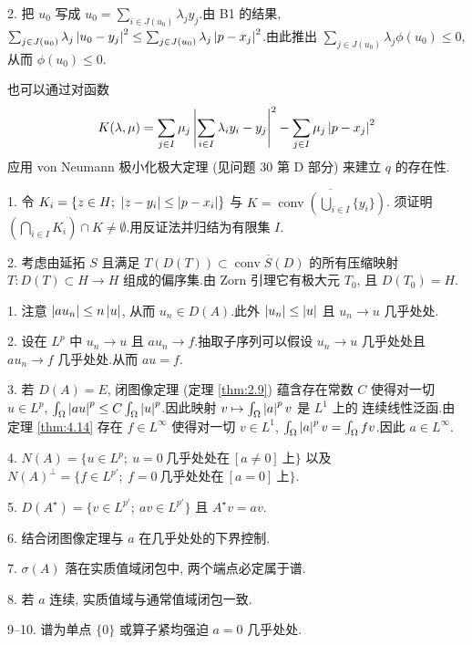 2. 把 $u_0$ 写成 $u_0=\sum_{i\in J(u_0)}\lambda_jy_j$.由 B1 的结果,
$\sum_{j\in J(u_0)}\lambda_j\left|u_0-y_j\right|^2\le\sum_{j\in J(u_0)}\lambda_j\left|p-x_j\right|^2$.由此推出
$\sum_{j\in J(u_0)}\lambda_j\phi(u_0)\le0$, 从而 $\phi(u_0)\le0$.

 也可以通过对函数
\begin{equation*}
K(\lambda,\mu)=\sum_{j\in I}\mu_j\left|\sum_{i\in I}\lambda_iy_i-y_j\right|^2-\sum_{j\in I}\mu_j\left|p-x_j\right|^2
\end{equation*}
应用 von Neumann 极小化极大定理 (见问题 30 第 D 部分) 来建立 $q$ 的存在性.


1. 令 $K_i=\{z\in H;\ \abs{z-y_i}\le\abs{p-x_i}\}$ 与 $K=\overline{\operatorname{conv}\left(\bigcup_{i\in I}\{y_i\}\right)}$.
须证明 $\left(\bigcap_{i\in I}K_i\right)\cap K\ne\emptyset$.用反证法并归结为有限集 $I$.

2. 考虑由延拓 $S$ 且满足 $T(D(T))\subset\overline{\operatorname{conv}S(D)}$ 的所有压缩映射
$T:D(T)\subset H\to H$ 组成的偏序集.由 Zorn 引理它有极大元 $T_0$, 且 $D(T_0)=H$.


1. 注意 $\left|au_n\right|\le n\left|u\right|$, 从而 $u_n\in D(A)$.此外 $\left|u_n\right|\le\left|u\right|$ 且 $u_n\to u$ 几乎处处.

2. 设在 $L^p$ 中 $u_n\to u$ 且 $au_n\to f$.抽取子序列可以假设 $u_n\to u$ 几乎处处且 $au_n\to f$ 几乎处处.从而 $au=f$.

3. 若 $D(A)=E$, 闭图像定理 (定理  \ref{thm:2.9}) 蕴含存在常数 $C$ 使得对一切 $u\in L^p$,
$\int_\Omega\left|au\right|^p\le C\int_\Omega\left|u\right|^p$.因此映射 $v\mapsto\int_\Omega\left|a\right|^pv$ 是 $L^1$ 上的
连续线性泛函.由定理  \ref{thm:4.14} 存在 $f\in L^\infty$ 使得对一切 $v\in L^1$,
$\int_\Omega\left|a\right|^pv=\int_\Omega fv$.因此 $a\in L^\infty$.

4. $N(A)=\{u\in L^p;\ u=0\ \text{几乎处处在}\ [a\ne0]\ \text{上}\}$ 以及
$N(A)^\perp=\{f\in L^{p'};\ f=0\ \text{几乎处处在}\ [a=0]\ \text{上}\}$.

5. $D(A^\star)=\{v\in L^{p'};\ av\in L^{p'}\}$ 且 $A^\star v=av$.

6. 结合闭图像定理与 $a$ 在几乎处处的下界控制.

7. $\sigma(A)$ 落在实质值域闭包中, 两个端点必定属于谱.

8. 若 $a$ 连续, 实质值域与通常值域闭包一致.

9--10. 谱为单点 $\{0\}$ 或算子紧均强迫 $a=0$ 几乎处处.


